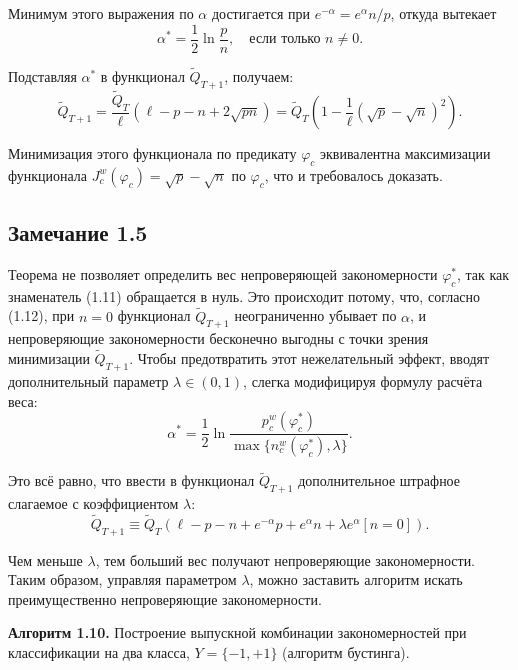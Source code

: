 Минимум этого выражения по $\alpha$ достигается при $e^{-\alpha} = e^\alpha n / p$, откуда вытекает 
\begin{equation}
    \alpha^* = \frac{1}{2} \ln \frac{p}{n}, \quad \text{если только } n \neq 0.
\end{equation}

Подставляя $\alpha^*$ в функционал $\tilde{Q}_{T+1}$, получаем:
\begin{equation}
    \tilde{Q}_{T+1} = \frac{\tilde{Q}_T}{\ell} \left( \ell - p - n + 2 \sqrt{p n} \right) = \tilde{Q}_T \left( 1 - \frac{1}{\ell} \left( \sqrt{p} - \sqrt{n} \right)^2 \right).
\end{equation}

Минимизация этого функционала по предикату $\varphi_c$ эквивалентна максимизации функционала $J_c^w(\varphi_c) = \sqrt{p} - \sqrt{n}$ по $\varphi_c$, что и требовалось доказать.

\subsection*{Замечание 1.5}

Теорема не позволяет определить вес непроверяющей закономерности $\varphi_c^*$, так как знаменатель (1.11) обращается в нуль. Это происходит потому, что, согласно (1.12), при $n = 0$ функционал $\tilde{Q}_{T+1}$ неограниченно убывает по $\alpha$, и непроверяющие закономерности бесконечно выгодны с точки зрения минимизации $\tilde{Q}_{T+1}$. Чтобы предотвратить этот нежелательный эффект, вводят дополнительный параметр $\lambda \in (0, 1)$, слегка модифицируя формулу расчёта веса:
\begin{equation}
    \alpha^* = \frac{1}{2} \ln \frac{p_c^w(\varphi_c^*)}{\max\{n_c^w(\varphi_c^*), \lambda\}}.
\end{equation}

Это всё равно, что ввести в функционал $\tilde{Q}_{T+1}$ дополнительное штрафное слагаемое с коэффициентом $\lambda$:
\begin{equation}
    \tilde{Q}_{T+1} \equiv \tilde{Q}_T \left( \ell - p - n + e^{-\alpha} p + e^\alpha n + \lambda e^\alpha \left[ n = 0 \right] \right).
\end{equation}

Чем меньше $\lambda$, тем больший вес получают непроверяющие закономерности. Таким образом, управляя параметром $\lambda$, можно заставить алгоритм искать преимущественно непроверяющие закономерности.

\textbf{Алгоритм 1.10.} Построение выпускной комбинации закономерностей при классификации на два класса, $Y = \{-1, +1\}$ (алгоритм бустинга).

